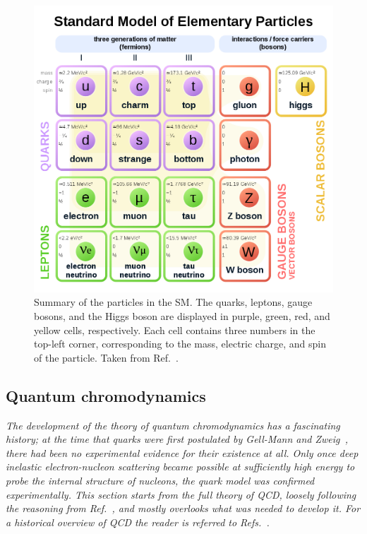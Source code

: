 \begin{figure}[hbtp]
  \begin{center}
    \includegraphics[width=0.7\linewidth]{img/theory/particles.png}
    \caption{
        Summary of the particles in the SM.
        The quarks, leptons, gauge bosons, and the Higgs boson are displayed in purple, green, red, and yellow cells, respectively.
        Each cell contains three numbers in the top-left corner, corresponding to the mass, electric charge, and spin of the particle.
        Taken from Ref.~\cite{particles-wikicommons}.
        }
    \label{fig:particles}
  \end{center}
\end{figure}




\subsection{Quantum chromodynamics}
\label{sec:qcd}

\textit{%
The development of the theory of quantum chromodynamics has a fascinating history; at the time that quarks were first postulated by Gell-Mann and Zweig~\cite{griffiths}, there had been no experimental evidence for their existence at all.
% 
Only once deep inelastic electron-nucleon scattering became possible at sufficiently high energy to probe the internal structure of nucleons, the quark model was confirmed experimentally.
% 
This section starts from the full theory of QCD, loosely following the reasoning from Ref.~\cite{dissertori}, and mostly overlooks what was needed to develop it.
% 
For a historical overview of QCD the reader is referred to Refs.~\cite{dissertori,griffiths}. 
}


